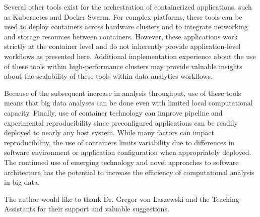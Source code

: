\documentclass[sigconf]{acmart}
\begin{document}
	Several other tools exist for the orchestration of containerized applications, such as Kubernetes and Docker Swarm. For complex platforms, these tools can be used to deploy containers across hardware clusters and to integrate networking and storage resources between containers. However, these applications work strictly at the container level and do not inherently provide application-level workflows as presented here. Additional implementation experience about the use of these tools within high-performance clusters may provide valuable insights about the scalability of these tools within data analytics workflows.
	
	Because of the subsequent increase in analysis throughput, use of these tools means that big data analyses can be done even with limited local computational capacity. Finally, use of container technology can improve pipeline and experimental reproducibility since preconfigured applications can be readily deployed to nearly any host system. While many factors can impact reproducibility, the use of containers limits variability due to differences in software environment or application configuration when appropriately deployed. The continued use of emerging technology and novel approaches to software architecture has the potential to increase the efficiency of computational analysis in big data.

\begin{acks}		
	
	The author would like to thank Dr. Gregor von Laszewski and the Teaching Assistants for their support and valuable suggestions.
	
\end{acks}


 
\end{document}

